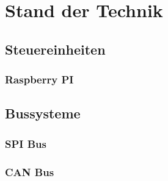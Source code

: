 \chapter{Stand der Technik}

\section{Steuereinheiten}
\subsection{Raspberry PI}

\section{Bussysteme}
\subsection{SPI Bus}
\subsection{CAN Bus}
